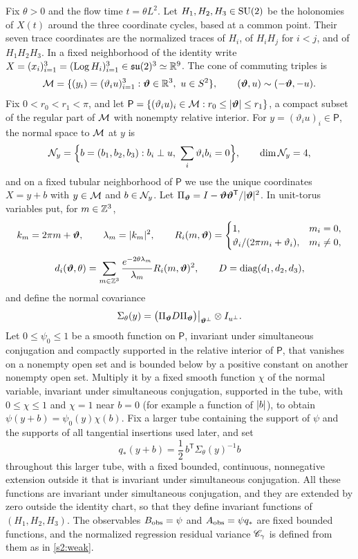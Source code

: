 \begin{definition}\label{ch01:def:toron-observables}
Fix $\theta>0$ and the flow time $t=\theta L^2$. Let $H_1,H_2,H_3\in\mathrm{SU}(2)$ be the holonomies of $X(t)$ around the three coordinate cycles, based at a common point. Their seven trace coordinates are the normalized traces of $H_i$, of $H_iH_j$ for $i<j$, and of $H_1H_2H_3$. In a fixed neighborhood of the identity write $X=(x_i)_{i=1}^3=(\operatorname{Log} H_i)_{i=1}^3\in\mathfrak{su}(2)^3\simeq\mathbb R^9$. The cone of commuting triples is
\[
 \CommMan=\{(y_i)=(\vartheta_iu)_{i=1}^3:\Toron\in\R^3,\ u\in S^2\},
 \qquad (\Toron,u)\sim(-\Toron,-u).
\]
Fix $0<r_0<r_1<\pi$, and let $\mathsf P=\{(\vartheta_iu)_i\in\mathcal M:r_0\le\lvert \bm\vartheta\rvert\le r_1\}$, a compact subset of the regular part of $\mathcal M$ with nonempty relative interior. For $y=(\vartheta_iu)_i\in\mathsf P$, the normal space to $\mathcal M$ at $y$ is
\[
 \NormalFiber y=\Bigl\{b=(b_1,b_2,b_3):b_i\perp u,\ \sum_i\vartheta_ib_i=0\Bigr\},\qquad
 \dim\NormalFiber y=4,
\]
and on a fixed tubular neighborhood of $\mathsf P$ we use the unique coordinates $X=y+b$ with $y\in\mathcal M$ and $b\in\mathcal N_{y}$. Let $\Pi_{\bm\vartheta}=I-\bm\vartheta\bm\vartheta^{\mathsf T}/\lvert \bm\vartheta\rvert^2$. In unit-torus variables put, for $m\in\mathbb Z^3$,
\[
 k_m=2\pi m+\bm\vartheta,\qquad\lambda_m=\lvert k_m\rvert^2,\qquad
 R_i(m,\bm\vartheta)=
 \begin{cases}1,&m_i=0,\\
 \vartheta_i/(2\pi m_i+\vartheta_i),&m_i\ne0,\end{cases}
\]
\[
 d_i(\bm\vartheta,\theta)=\sum_{m\in\mathbb Z^3}
            \frac{e^{-2\theta\lambda_m}}{\lambda_m}R_i(m,\bm\vartheta)^2,
 \qquad D=\operatorname{diag}(d_1,d_2,d_3),
\]
and define the normal covariance
\begin{equation}\label{ch01:eq:normal-covariance}
 \Sigma_\theta(y)=
  \bigl(\Pi_{\bm\vartheta}D\Pi_{\bm\vartheta}\bigr)\big|_{\bm\vartheta^\perp}\otimes I_{u^\perp}.
\end{equation}
Let $0\le\psi_0\le1$ be a smooth function on $\mathsf P$, invariant under simultaneous conjugation and compactly supported in the relative interior of $\mathsf P$, that vanishes on a nonempty open set and is bounded below by a positive constant on another nonempty open set. Multiply it by a fixed smooth function $\chi$ of the normal variable, invariant under simultaneous conjugation, supported in the tube, with $0\le\chi\le1$ and $\chi=1$ near $b=0$ (for example a function of $\lvert b\rvert$), to obtain $\psi(y+b)=\psi_0(y)\chi(b)$. Fix a larger tube containing the support of $\psi$ and the supports of all tangential insertions used later, and set
\[
 q_*(y+b)=\frac12\,b^{\mathsf T}\Sigma_\theta(y)^{-1}b
\]
throughout this larger tube, with a fixed bounded, continuous, nonnegative extension outside it that is invariant under simultaneous conjugation. All these functions are invariant under simultaneous conjugation, and they are extended by zero outside the identity chart, so that they define invariant functions of $(H_1,H_2,H_3)$. The observables $B_{\mathrm{obs}}=\psi$ and $A_{\mathrm{obs}}=\psi q_*$ are fixed bounded functions, and the normalized regression residual variance $\mathscr C_\gamma$ is defined from them as in \cref{s2:weak}.
\end{definition}

